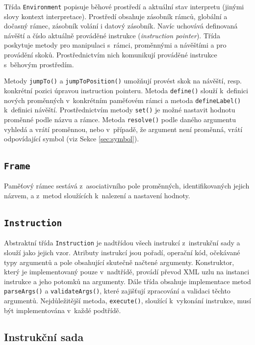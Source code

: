 \documentclass{article}[a4paper]
\begin{document}
    Třída \texttt{Environment} popisuje běhové prostředí a aktuální stav interpretu (jinými slovy kontext interpretace).
    Prostředí obsahuje zásobník rámců, globální a dočasný rámec, zásobník volání i datový zásobník.
    Navíc uchovává definovaná návěští a číslo aktuálně prováděné instrukce (\emph{instruction pointer}).
    Třída poskytuje metody pro manipulaci s~rámci, proměnnými a návěštími a pro provádění skoků.
    Prostřednictvím nich komunikují prováděné instrukce s~běhovým prostředím.

    Metody \texttt{jumpTo()} a \texttt{jumpToPosition()} umožňují provést skok na návěští, resp. konkrétní pozici úpravou instruction pointeru.
    Metoda \texttt{define()} slouží k~definici nových proměnných v~konkrétním paměťovém rámci a metoda \texttt{defineLabel()} k~definici návěští.
    Prostřednictvím metody \texttt{set()} je možné nastavit hodnotu proměnné podle názvu a rámce.
    Metoda \texttt{resolve()} podle daného argumentu vyhledá a vrátí proměnnou, nebo v~případě, že argument není proměnná, vrátí odpovídající symbol (viz Sekce \ref{sec:symbol}).

    \subsection{\texttt{Frame}}

    Paměťový rámec sestává z~asociativního pole proměnných, identifikovaných jejich názvem, a z~metod sloužících k~nalezení a nastavení hodnoty.

    \subsection{\texttt{Instruction}}
    \label{sec:instruction}

    Abstraktní třída \texttt{Instruction} je nadtřídou všech instrukcí z~instrukční sady a slouží jako jejich vzor.
    Atributy instrukcí jsou pořadí, operační kód, očekávané typy argumentů a pole obsahující skutečně načtené argumenty.
    Konstruktor, který je implementovaný pouze v~nadtřídě, provádí převod XML uzlu na instanci instrukce a jeho potomků na argumenty.
    Dále třída obsahuje implementace metod \texttt{parseArgs()} a \texttt{validateArgs()}, které zajišťují zpracování a validaci těchto argumentů.
    Nejdůležitější metoda, \texttt{execute()}, sloužící k~vykonání instrukce, musí být implementována v~každé podtřídě.

    \subsection{Instrukční sada}
\end{document}
